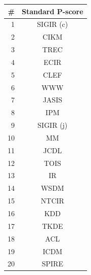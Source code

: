 \begin{tabular}{rc}
\toprule
\#		&	Standard P-score \\ 
\midrule
1		&	SIGIR (c) \\
2		&	CIKM		\\
3		&	TREC	\\	
4		&	ECIR		\\
5		&	CLEF		\\
6		&	WWW	\\		
7		&	JASIS	\\	
8		&	IPM		\\	
9		&	SIGIR (j) \\
10		&	MM	\\		
11		&	JCDL		\\
12		&	TOIS		\\
13		&	IR			\\
14		&	WSDM	\\
15		&	NTCIR	\\
16		&	KDD		\\
17		&	TKDE	\\
18		&	ACL		\\
19		&	ICDM		\\
20		&	SPIRE	\\
\bottomrule
\end{tabular} \ \ 

